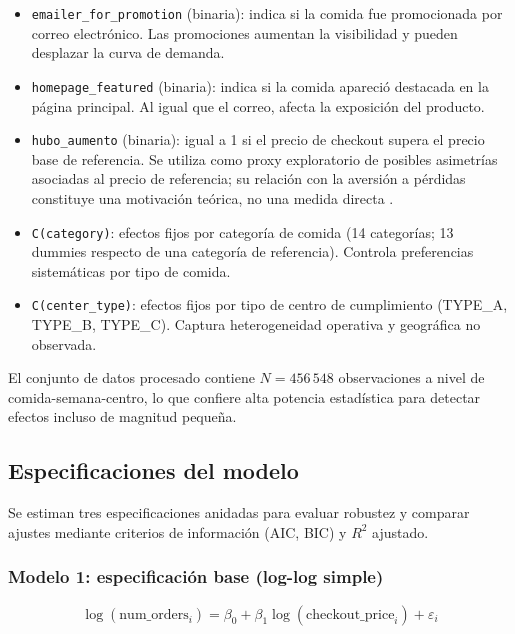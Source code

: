 \documentclass[doc, a4paper, biblatex, floatsintext, longtable, babel]{apa7}
\begin{document}
\begin{itemize}
    \item \texttt{emailer\_for\_promotion} (binaria): indica si la comida fue promocionada por correo electr\'onico. Las promociones aumentan la visibilidad y pueden desplazar la curva de demanda.
    \item \texttt{homepage\_featured} (binaria): indica si la comida apareci\'o destacada en la p\'agina principal. Al igual que el correo, afecta la exposici\'on del producto.
    \item \texttt{hubo\_aumento} (binaria): igual a 1 si el precio de checkout supera el precio base de referencia. Se utiliza como proxy exploratorio de posibles asimetrías asociadas al precio de referencia; su relación con la aversión a pérdidas constituye una motivación teórica, no una medida directa \parencite{kahneman1991}.
    \item \texttt{C(category)}: efectos fijos por categoría de comida (14 categorías; 13 dummies respecto de una categoría de referencia). Controla preferencias sistemáticas por tipo de comida.
    \item \texttt{C(center\_type)}: efectos fijos por tipo de centro de cumplimiento (TYPE\_A, TYPE\_B, TYPE\_C). Captura heterogeneidad operativa y geogr\'afica no observada.
\end{itemize}

El conjunto de datos procesado contiene $N = 456\,548$ observaciones a nivel de comida-semana-centro, lo que confiere alta potencia estad\'istica para detectar efectos incluso de magnitud peque\~na.

\subsection{Especificaciones del modelo}
\label{sec:especificaciones-modelo}

Se estiman tres especificaciones anidadas para evaluar robustez y comparar ajustes mediante criterios de informaci\'on (AIC, BIC) y $R^2$ ajustado.

\subsubsection{Modelo 1: especificaci\'on base (log-log simple)}
\begin{equation}
\log(\text{num\_orders}_i) = \beta_0 + \beta_1 \log(\text{checkout\_price}_i) + \varepsilon_i
\label{eq:modelo-1}
\end{equation}
\end{document}
